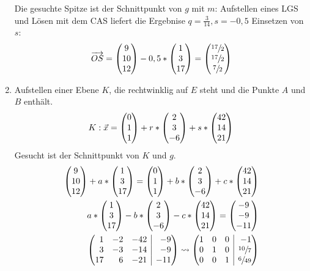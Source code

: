 \begin{lsg}{}
\begin{enumerate}
\begin{equation*}
		\end{equation*}
		Die gesuchte Spitze ist der Schnittpunkt von $g$ mit $m$:
		Aufstellen eines LGS und Lösen mit dem CAS liefert die Ergebnise $q=\frac 3{14}, s=-0,5$
		Einsetzen von $s$:
		\begin{equation*}
			\overrightarrow{OS}=\begin{pmatrix} 9\\10\\12 \end{pmatrix}-0,5*\begin{pmatrix} 1\\3\\17 \end{pmatrix}=\begin{pmatrix} \sfrac{17}2\\\sfrac{17}2\\\sfrac{7}2 \end{pmatrix}
		\end{equation*}
		\item Aufstellen einer Ebene $K$, die rechtwinklig auf $E$ steht und die Punkte $A$ und $B$ enthält.
		\begin{equation*}
			K: \vec x=\begin{pmatrix} 0\\1\\1 \end{pmatrix}+r*\begin{pmatrix} 2\\3\\-6 \end{pmatrix}+s*\begin{pmatrix} 42\\14\\21 \end{pmatrix}
		\end{equation*}
		Gesucht ist der Schnittpunkt von $K$ und $g$.
		\begin{align*}
			\vektor{9\\10\\12}+a*\vektor{1\\3\\17}=\vektor{0\\1\\1}+b*\vektor{2\\3\\-6}+c*\vektor{42\\14\\21}\\
			a*\vektor{1\\3\\17}-b*\vektor{2\\3\\-6}-c*\vektor{42\\14\\21}=\vektor{-9\\-9\\-11}\\
			\ematrix{rrr|r}{1&-2&-42&-9\\3&-3&-14&-9\\17&6&-21&-11}\rightsquigarrow\ematrix{rrr|r}{1&0&0&-1\\0&1&0&\sfrac{10}7\\0&0&1&\sfrac6{49}}

\end{align*}
\end{enumerate}
\end{lsg}
